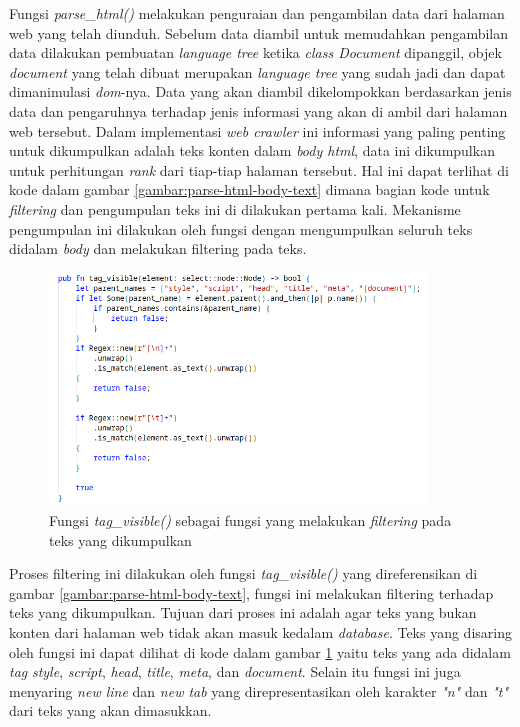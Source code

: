 Fungsi \emph{parse\_html()} melakukan penguraian dan pengambilan data dari halaman web yang telah diunduh. Sebelum data diambil untuk memudahkan pengambilan data dilakukan pembuatan \emph{language tree} ketika \emph{class Document} dipanggil, objek \emph{document} yang telah dibuat merupakan \emph{language tree} yang sudah jadi dan dapat dimanimulasi \emph{dom}-nya. Data yang akan diambil dikelompokkan berdasarkan jenis data dan pengaruhnya terhadap jenis informasi yang akan di ambil dari halaman web tersebut. Dalam implementasi \emph{web crawler} ini informasi yang paling penting untuk dikumpulkan adalah teks konten dalam \emph{body html}, data ini dikumpulkan untuk perhitungan \emph{rank} dari tiap-tiap halaman tersebut. Hal ini dapat terlihat di kode dalam gambar \ref{gambar:parse-html-body-text} dimana bagian kode untuk \emph{filtering} dan pengumpulan teks ini di dilakukan pertama kali. Mekanisme pengumpulan ini dilakukan oleh fungsi dengan mengumpulkan seluruh teks didalam \emph{body} dan melakukan filtering pada teks.

\begin{figure}[H]
  \centering
  \includegraphics[keepaspectratio, width=10cm]{gambar/parser-tag-visible.png}
  \caption{Fungsi \emph{tag\_visible()} sebagai fungsi yang melakukan \emph{filtering} pada teks yang dikumpulkan}
  \label{gambar:parse-tag-visible}
\end{figure}

Proses filtering ini dilakukan oleh fungsi \emph{tag\_visible()} yang direferensikan di gambar \ref{gambar:parse-html-body-text}, fungsi ini melakukan filtering terhadap teks yang dikumpulkan. Tujuan dari proses ini adalah agar teks yang bukan konten dari halaman web tidak akan masuk kedalam \emph{database}. Teks yang disaring oleh fungsi ini dapat dilihat di kode dalam gambar \ref{gambar:parse-tag-visible} yaitu teks yang ada didalam \emph{tag} \emph{style}, \emph{script}, \emph{head}, \emph{title}, \emph{meta}, dan \emph{document}. Selain itu fungsi ini juga menyaring \emph{new line} dan \emph{new tab} yang direpresentasikan oleh karakter \emph{"n"} dan \emph{"t"} dari teks yang akan dimasukkan.

